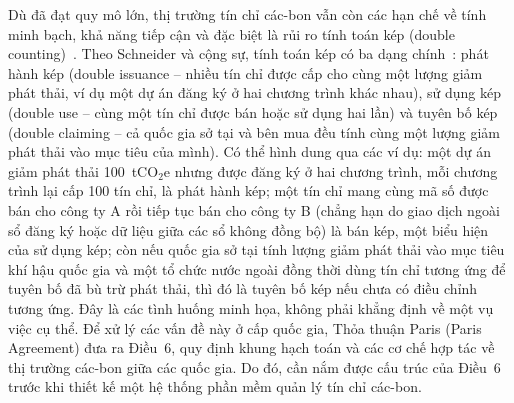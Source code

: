 Dù đã đạt quy mô lớn, thị trường tín chỉ các-bon vẫn còn các hạn chế về tính minh bạch, khả năng tiếp cận và đặc biệt là rủi ro tính toán kép (double counting)~\cite{schneider2019double}. Theo Schneider và cộng sự, tính toán kép có ba dạng chính~\cite{schneider2019double}: phát hành kép (double issuance -- nhiều tín chỉ được cấp cho cùng một lượng giảm phát thải, ví dụ một dự án đăng ký ở hai chương trình khác nhau), sử dụng kép (double use -- cùng một tín chỉ được bán hoặc sử dụng hai lần) và tuyên bố kép (double claiming -- cả quốc gia sở tại và bên mua đều tính cùng một lượng giảm phát thải vào mục tiêu của mình). Có thể hình dung qua các ví dụ: một dự án giảm phát thải 100~tCO$_2$e nhưng được đăng ký ở hai chương trình, mỗi chương trình lại cấp 100 tín chỉ, là phát hành kép; một tín chỉ mang cùng mã số được bán cho công ty A rồi tiếp tục bán cho công ty B (chẳng hạn do giao dịch ngoài sổ đăng ký hoặc dữ liệu giữa các sổ không đồng bộ) là bán kép, một biểu hiện của sử dụng kép; còn nếu quốc gia sở tại tính lượng giảm phát thải vào mục tiêu khí hậu quốc gia và một tổ chức nước ngoài đồng thời dùng tín chỉ tương ứng để tuyên bố đã bù trừ phát thải, thì đó là tuyên bố kép nếu chưa có điều chỉnh tương ứng. Đây là các tình huống minh họa, không phải khẳng định về một vụ việc cụ thể. Để xử lý các vấn đề này ở cấp quốc gia, Thỏa thuận Paris (Paris Agreement) đưa ra Điều~6, quy định khung hạch toán và các cơ chế hợp tác về thị trường các-bon giữa các quốc gia. Do đó, cần nắm được cấu trúc của Điều~6 trước khi thiết kế một hệ thống phần mềm quản lý tín chỉ các-bon.

